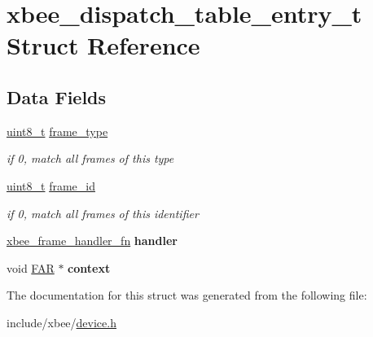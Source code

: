 \hypertarget{structxbee__dispatch__table__entry__t}{}\section{xbee\+\_\+dispatch\+\_\+table\+\_\+entry\+\_\+t Struct Reference}
\label{structxbee__dispatch__table__entry__t}
\subsection*{Data Fields}
\begin{DoxyCompactItemize}
\item 
\hyperlink{group__hal__dos_gae1affc9ca37cfb624959c866a73f83c2}{uint8\+\_\+t} \hyperlink{group__xbee__device_gafa34d393db5fa915716b483011415ddc}{frame\+\_\+type}
\begin{DoxyCompactList}\small\item\em if 0, match all frames of this type \end{DoxyCompactList}\item 
\hyperlink{group__hal__dos_gae1affc9ca37cfb624959c866a73f83c2}{uint8\+\_\+t} \hyperlink{group__xbee__device_ga03c1016ac46b9df250b994f242cf956a}{frame\+\_\+id}
\begin{DoxyCompactList}\small\item\em if 0, match all frames of this identifier \end{DoxyCompactList}\item 
\hyperlink{group__xbee__device_ga3e6f2b540e8cec7a69ef0b0166da14ff}{xbee\+\_\+frame\+\_\+handler\+\_\+fn} {\bfseries handler}
\item 
void \hyperlink{group__hal_gaef060b3456fdcc093a7210a762d5f2ed}{F\+AR} $\ast$ {\bfseries context}
\end{DoxyCompactItemize}


The documentation for this struct was generated from the following file\+:\begin{DoxyCompactItemize}
\item 
include/xbee/\hyperlink{device_8h}{device.\+h}\end{DoxyCompactItemize}
